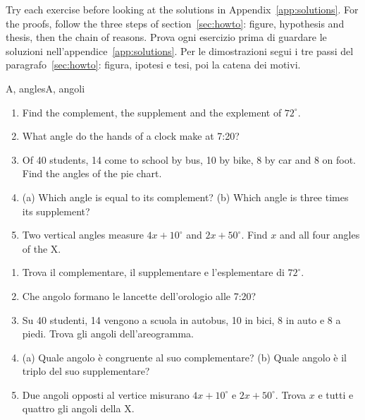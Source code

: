 \label{ch:exercises}

\begin{bi}
\colheads
Try each exercise before looking at the solutions in Appendix~\ref{app:solutions}. For the proofs, follow the three steps of section~\ref{sec:howto}: figure, hypothesis and thesis, then the chain of reasons.
\IT
Prova ogni esercizio prima di guardare le soluzioni nell'appendice~\ref{app:solutions}. Per le dimostrazioni segui i tre passi del paragrafo~\ref{sec:howto}: figura, ipotesi e tesi, poi la catena dei motivi.
\end{bi}

\begin{exercise}{A, angles}{A, angoli}
\begin{enumerate}[label=\textbf{A\arabic*.}, leftmargin=2.2em]
\item Find the complement, the supplement and the explement of $72^\circ$.
\item What angle do the hands of a clock make at 7:20?
\item Of 40 students, 14 come to school by bus, 10 by bike, 8 by car and 8 on foot. Find the angles of the pie chart.
\item (a) Which angle is equal to its complement? (b) Which angle is three times its supplement?
\item Two vertical angles measure $4x + 10^\circ$ and $2x + 50^\circ$. Find $x$ and all four angles of the X.
\end{enumerate}
\tcblower
\begin{enumerate}[label=\textbf{A\arabic*.}, leftmargin=2.2em]
\item Trova il complementare, il supplementare e l'esplementare di $72^\circ$.
\item Che angolo formano le lancette dell'orologio alle 7:20?
\item Su 40 studenti, 14 vengono a scuola in autobus, 10 in bici, 8 in auto e 8 a piedi. Trova gli angoli dell'areogramma.
\item (a) Quale angolo è congruente al suo complementare? (b) Quale angolo è il triplo del suo supplementare?
\item Due angoli opposti al vertice misurano $4x + 10^\circ$ e $2x + 50^\circ$. Trova $x$ e tutti e quattro gli angoli della X.
\end{enumerate}
\end{exercise}

